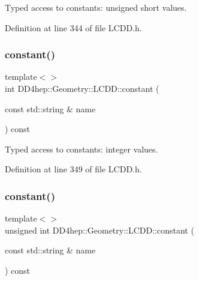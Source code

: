 Typed access to constants\+: unsigned short values. 



Definition at line 344 of file L\+C\+D\+D.\+h.

\hypertarget{class_d_d4hep_1_1_geometry_1_1_l_c_d_d_a0203983a09a1a7d584f05ed000dc9f6f}{}\label{class_d_d4hep_1_1_geometry_1_1_l_c_d_d_a0203983a09a1a7d584f05ed000dc9f6f} 
\subsubsection{\texorpdfstring{constant()}{constant()}\hspace{0.1cm}{\footnotesize\ttfamily [5/10]}}
{\footnotesize\ttfamily template$<$$>$ \\
int D\+D4hep\+::\+Geometry\+::\+L\+C\+D\+D\+::constant (\begin{DoxyParamCaption}\item[{const std\+::string \&}]{name }\end{DoxyParamCaption}) const\hspace{0.3cm}{\ttfamily [inline]}}



Typed access to constants\+: integer values. 



Definition at line 349 of file L\+C\+D\+D.\+h.

\hypertarget{class_d_d4hep_1_1_geometry_1_1_l_c_d_d_a8ec97cc23881278c36d348ca958a04e1}{}\label{class_d_d4hep_1_1_geometry_1_1_l_c_d_d_a8ec97cc23881278c36d348ca958a04e1} 
\subsubsection{\texorpdfstring{constant()}{constant()}\hspace{0.1cm}{\footnotesize\ttfamily [6/10]}}
{\footnotesize\ttfamily template$<$$>$ \\
unsigned int D\+D4hep\+::\+Geometry\+::\+L\+C\+D\+D\+::constant (\begin{DoxyParamCaption}\item[{const std\+::string \&}]{name }\end{DoxyParamCaption}) const\hspace{0.3cm}{\ttfamily [inline]}}



